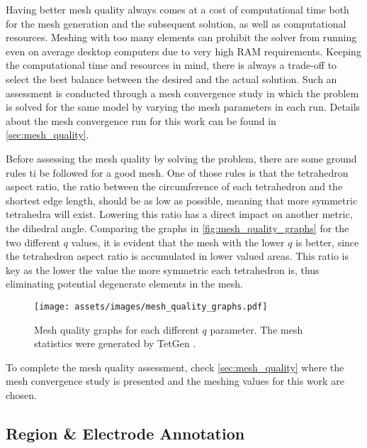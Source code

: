 Having better mesh quality always comes at a cost of computational time both for the mesh generation and the subsequent solution, as well as computational resources. Meshing with too many elements can prohibit the solver from running even on average desktop computers due to very high \gls{RAM} requirements. Keeping the computational time and resources in mind, there is always a trade-off to select the best balance between the desired and the actual solution. Such an assessment is conducted through a mesh convergence study in which the problem is solved for the same model by varying the mesh parameters in each run. Details about the mesh convergence run for this work can be found in \ref{sec:mesh_quality}.

Before assessing the mesh quality by solving the problem, there are some ground rules ti be followed for a good mesh. One of those rules is that the \gls{tetrahedron aspect ratio}, the ratio between the circumference of each tetrahedron and the shortest edge length, should be as low as possible, meaning that more symmetric tetrahedra will exist. Lowering this ratio has a direct impact on another metric, the dihedral angle. Comparing the graphs in \autoref{fig:mesh_quality_graphs} for the two different $q$ values, it is evident that the mesh with the lower $q$ is better, since the \gls{tetrahedron aspect ratio} is accumulated in lower valued areas. This ratio is key as the lower the value the more symmetric each tetrahedron is, thus eliminating potential degenerate elements in the mesh.

\begin{figure}[H]
    \centering
    \texttt{[image: assets/images/mesh\_quality\_graphs.pdf]}
    \caption[Mesh quality graphs for each different $q$ parameter]{Mesh quality graphs for each different $q$ parameter. The mesh statistics were generated by TetGen \cite{tetgen}.}
    \label{fig:mesh_quality_graphs}
\end{figure}

To complete the mesh quality assessment, check \autoref{sec:mesh_quality} where the mesh convergence study is presented and the meshing values for this work are chosen.

\subsection{Region \& Electrode Annotation}
\label{subsec:elec_annotation}

